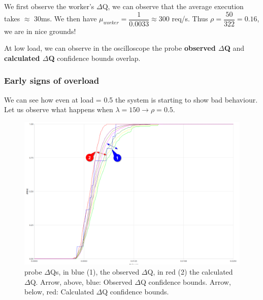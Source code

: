     We first observe the worker's $\Delta$Q, we can observe that the average execution takes $\approx$ 30ms. We then have $\mu_{worker} = \dfrac{1}{0.0033} \approx 300$ req/s. Thus $\rho = \dfrac{50}{322} = 0.16$, we are in nice grounds!

    At low load, we can observe in the oscilloscope the probe \textbf{observed $\Delta$Q} and \textbf{calculated $\Delta$Q} confidence bounds overlap. 

\subsubsection{Early signs of overload}
    
    We can see how even at load = 0.5 the system is starting to show bad behaviour. Let us observe what happens when $\lambda = 150 \rightarrow \rho = 0.5$.

    \begin{figure}[H]
        \begin{center}
        \includegraphics[scale = 0.3]{img/overload_2/150_probe2.png}
        \end{center}
            \caption{probe $\Delta$Qs, in blue (1), the observed $\Delta$Q, in red (2) the calculated $\Delta$Q. Arrow, above, blue: Observed $\Delta$Q confidence bounds. Arrow, below, red: Calculated $\Delta$Q confidence bounds.}%
        \label{fig:early_ov}
    \end{figure}
    
